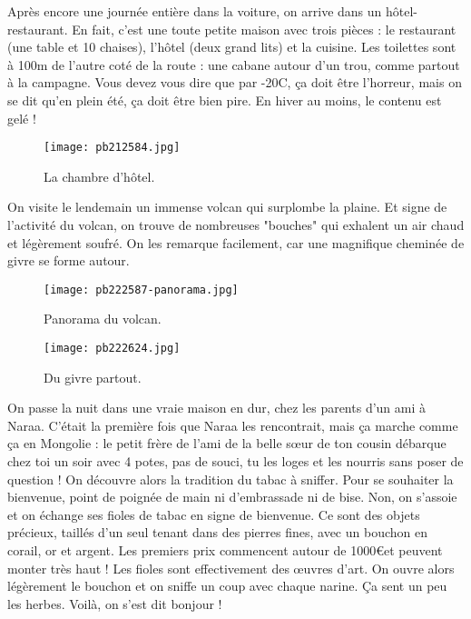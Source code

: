 \documentclass{book}
\begin{document}
Après encore une journée entière dans la voiture, on arrive dans un hôtel-restaurant. En fait, c'est une toute petite maison avec trois pièces : le restaurant (une table et 10 chaises), l'hôtel (deux grand lits) et la cuisine. Les toilettes sont à 100m de l'autre coté de la route : une cabane autour d'un trou, comme partout à la campagne. Vous devez vous dire que par -20\textdegree C, ça doit être l'horreur, mais on se dit qu'en plein été, ça doit être bien pire. En hiver au moins, le contenu est gelé !


\begin{figure}[h]
\centering
\texttt{[image: pb212584.jpg]}
\caption*{ La chambre d'hôtel.}
\end{figure}

On visite le lendemain un immense volcan qui surplombe la plaine. Et signe de l'activité du volcan, on trouve de nombreuses "bouches" qui exhalent un air chaud et légèrement soufré. On les remarque facilement, car une magnifique cheminée de givre se forme autour.


\begin{figure}[h]
\centering
\texttt{[image: pb222587-panorama.jpg]}
\caption*{ Panorama du volcan.}
\end{figure}


\begin{figure}[h]
\centering
\texttt{[image: pb222624.jpg]}
\caption*{ Du givre partout.}
\end{figure}

On passe la nuit dans une vraie maison en dur, chez les parents d'un ami à Naraa. C'était la première fois que Naraa les rencontrait, mais ça marche comme ça en Mongolie : le petit frère de l'ami de la belle sœur de ton cousin débarque chez toi un soir avec 4 potes, pas de souci, tu les loges et les nourris sans poser de question ! On découvre alors la tradition du tabac à sniffer. Pour se souhaiter la bienvenue, point de poignée de main ni d'embrassade ni de bise. Non, on s'assoie et on échange ses fioles de tabac en signe de bienvenue. Ce sont des objets précieux, taillés d'un seul tenant dans des pierres fines, avec un bouchon en corail, or et argent. Les premiers prix commencent autour de 1000\euro et peuvent monter très haut ! Les fioles sont effectivement des œuvres d'art. On ouvre alors légèrement le bouchon et on sniffe un coup avec chaque narine. Ça sent un peu les herbes. Voilà, on s'est dit bonjour !
\end{document}
